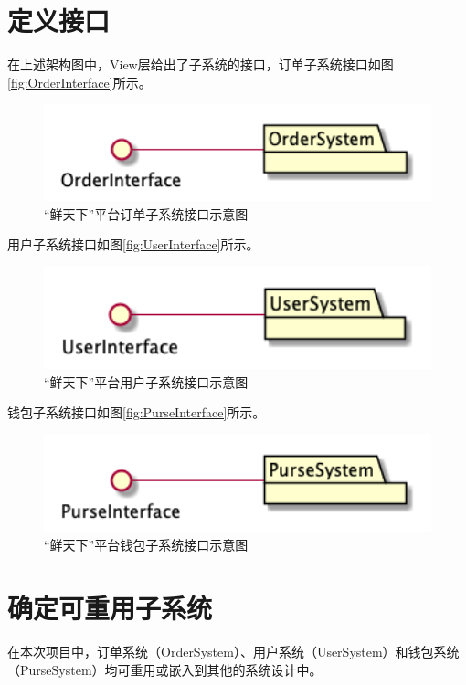 \section{定义接口}
    在上述架构图中，View层给出了子系统的接口，订单子系统接口如图\autoref{fig:OrderInterface}所示。
    \begin{figure}[htp]
        \centering
        \includegraphics[width=12cm]{report/figure/subsystem/OrderInterface.png}
        \caption{“鲜天下”平台订单子系统接口示意图}
        \label{fig:OrderInterface}
    \end{figure}
    
    用户子系统接口如图\autoref{fig:UserInterface}所示。
    \begin{figure}[htp]
        \centering
        \includegraphics[width=12cm]{report/figure/subsystem/UserInterface.png}
        \caption{“鲜天下”平台用户子系统接口示意图}
        \label{fig:UserInterface}
    \end{figure}
    
    钱包子系统接口如图\autoref{fig:PurseInterface}所示。
    \begin{figure}[htp]
        \centering
        \includegraphics[width=12cm]{report/figure/subsystem/PurseInterface.png}
        \caption{“鲜天下”平台钱包子系统接口示意图}
        \label{fig:PurseInterface}
    \end{figure}
    
\section{确定可重用子系统}
    在本次项目中，订单系统（OrderSystem）、用户系统（UserSystem）和钱包系统（PurseSystem）均可重用或嵌入到其他的系统设计中。